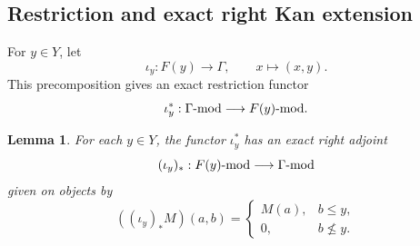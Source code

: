 \documentclass[12pt,a4paper,english,reqno]{amsart}
\theoremstyle{plain}
\newtheorem{lemma}[theorem]{Lemma}
\theoremstyle{definition}
\newcommand{\G}{\Gamma}
\newcommand{\modcat}{\ensuremath{\mbox{\rm -mod}}}
\begin{document}
\subsection{Restriction and exact right Kan extension}

For $y\in Y$, let
\[
 \iota_y:F(y)\longrightarrow\G,\qquad x\longmapsto(x,y).
\]
This precomposition gives an exact restriction functor
\[
 \iota_y^*:\G\modcat\longrightarrow F(y)\modcat.
\]

\begin{lemma}
\label{lem:kan}
For each $y\in Y$, the functor $\iota_y^*$ has an exact right adjoint
\[
 (\iota_y)_*: F(y)\modcat\longrightarrow\G\modcat
\]
given on objects by
\begin{equation}
 ((\iota_y)_*M)(a,b)=
 \begin{cases}
 M(a),&b\leq y,\\
 0,&b\nleq y.
 \end{cases}
\label{eq:kan-formula}
\end{equation}
\end{lemma}
\end{document}
